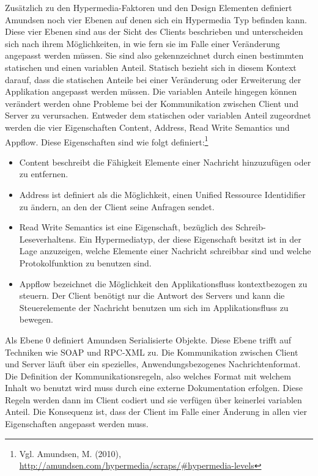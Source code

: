 Zusätzlich zu den Hypermedia-Faktoren und den Design Elementen definiert Amundsen noch vier Ebenen auf denen sich ein Hypermedia Typ befinden kann. Diese vier Ebenen sind aus der Sicht des Clients beschrieben und unterscheiden sich nach ihrem Möglichkeiten, in wie fern sie im Falle einer Veränderung angepasst werden müssen. Sie sind also gekennzeichnet durch einen bestimmten statischen und einen variablen Anteil. Statisch bezieht sich in diesem Kontext darauf, dass die statischen Anteile bei einer Veränderung oder Erweiterung der Applikation angepasst werden müssen. Die variablen Anteile hingegen können verändert werden ohne Probleme bei der Kommunikation zwischen Client und Server zu verursachen. Entweder dem statischen oder variablen Anteil zugeordnet werden die vier Eigenschaften Content, Address, Read Write Semantics und Appflow. Diese Eigenschaften sind wie folgt definiert:\footnote{Vgl. Amundsen, M. (2010), \url{http://amundsen.com/hypermedia/scraps/#hypermedia-levels}}
\begin{itemize}
\item Content beschreibt die Fähigkeit Elemente einer Nachricht hinzuzufügen oder zu entfernen.
\item Address ist definiert als die Möglichkeit, einen Unified Ressource Identidifier zu ändern, an den der Client seine Anfragen sendet.
\item Read Write Semantics ist eine Eigenschaft, bezüglich des Schreib-Leseverhaltens. Ein Hypermediatyp, der diese Eigenschaft besitzt ist in der Lage anzuzeigen, welche Elemente einer Nachricht schreibbar sind und welche Protokolfunktion zu benutzen sind.
\item Appflow bezeichnet die Möglichkeit den Applikationsfluss kontextbezogen zu steuern. Der Client benötigt nur die Antwort des Servers und kann die Steuerelemente der Nachricht benutzen um sich im Applikationsfluss zu bewegen.
\end{itemize}
Als Ebene 0 definiert Amundsen Serialisierte Objekte. Diese Ebene trifft auf Techniken wie SOAP und RPC-XML zu. Die Kommunikation zwischen Client und Server läuft über ein spezielles, Anwendungsbezogenes Nachrichtenformat. Die Definition der Kommunikationsregeln, also welches Format mit welchem Inhalt wo benutzt wird muss durch eine externe Dokumentation erfolgen. Diese Regeln werden dann im Client codiert und sie verfügen über keinerlei variablen Anteil. Die Konsequenz ist, dass der Client im Falle einer Änderung in allen vier Eigenschaften angepasst werden muss.\\

